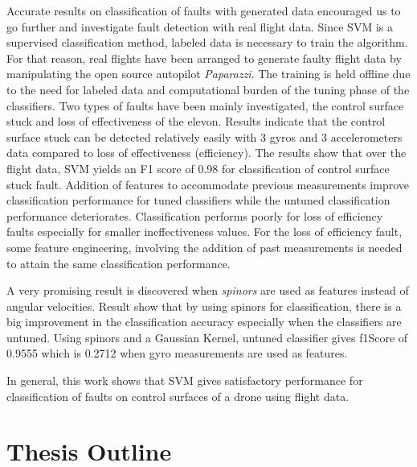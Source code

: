 Accurate results on classification of faults with generated data encouraged us to go further and investigate fault detection with real flight data. 
Since SVM is a supervised classification method, labeled data is necessary to train the algorithm. For that reason, real flights have been arranged to generate faulty flight data by manipulating the open source autopilot \emph{Paparazzi}.  
The training is held offline due to the need for labeled data and computational burden of the tuning phase of the classifiers. 
Two types of faults have been mainly investigated, the control surface stuck and loss of effectiveness of the elevon. Results indicate that the control surface stuck can be detected relatively easily with 3 gyros and 3 accelerometers data compared to loss of effectiveness (efficiency). 
The results show that over the flight data, SVM yields an F1 score of 0.98 for classification of control surface stuck fault. 
Addition of features to accommodate previous measurements improve classification performance for tuned classifiers while the untuned classification performance deteriorates. 
Classification performs poorly for loss of efficiency faults especially for smaller ineffectiveness values. 
For the loss of efficiency fault, some feature engineering, involving the addition of past measurements is needed to attain the same classification performance.

A very promising result is discovered when \emph{spinors} are used as features instead of angular velocities. 
Result show that by using spinors for classification, there is a big improvement in the classification accuracy especially when the classifiers are untuned. Using spinors and a Gaussian Kernel, untuned classifier gives f1Score of 0.9555 which is 0.2712 when gyro measurements are used as features.

In general, this work shows that SVM gives satisfactory performance for classification of faults on control surfaces of a drone using flight data.

\section{Thesis Outline}

